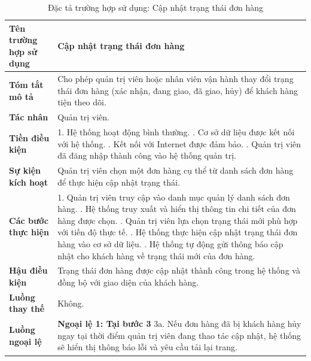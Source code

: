 {
\begin{longtable}{|>{\bfseries}p{4cm}|p{11.5cm}|}
\caption{Đặc tả trường hợp sử dụng: Cập nhật trạng thái đơn hàng}
\label{tab:uc-admin-update-order-status} \\
\hline
\textbf{Tên trường hợp sử dụng} & Cập nhật trạng thái đơn hàng \\
\hline
\textbf{Tóm tắt mô tả} & Cho phép quản trị viên hoặc nhân viên vận hành thay đổi trạng thái đơn hàng (xác nhận, đang giao, đã giao, hủy) để khách hàng tiện theo dõi. \\
\hline
\textbf{Tác nhân} & Quản trị viên. \\
\hline
\textbf{Tiền điều kiện} & 1. Hệ thống hoạt động bình thường. \newline
2. Cơ sở dữ liệu được kết nối với hệ thống. \newline
3. Kết nối với Internet được đảm bảo. \newline
4. Quản trị viên đã đăng nhập thành công vào hệ thống quản trị. \\
\hline
\textbf{Sự kiện kích hoạt} & Quản trị viên chọn một đơn hàng cụ thể từ danh sách đơn hàng để thực hiện cập nhật trạng thái. \\
\hline
\textbf{Các bước thực hiện} & 1. Quản trị viên truy cập vào danh mục quản lý danh sách đơn hàng. \newline
2. Hệ thống truy xuất và hiển thị thông tin chi tiết của đơn hàng được chọn. \newline
3. Quản trị viên lựa chọn trạng thái mới phù hợp với tiến độ thực tế. \newline
4. Hệ thống thực hiện cập nhật trạng thái đơn hàng vào cơ sở dữ liệu. \newline
5. Hệ thống tự động gửi thông báo cập nhật cho khách hàng về trạng thái mới của đơn hàng. \\
\hline
\textbf{Hậu điều kiện} & Trạng thái đơn hàng được cập nhật thành công trong hệ thống và đồng bộ với giao diện của khách hàng. \\
\hline
\textbf{Luồng thay thế} & Không. \\
\hline
\textbf{Luồng ngoại lệ} & \textbf{Ngoại lệ 1: Tại bước 3} \newline
3a. Nếu đơn hàng đã bị khách hàng hủy ngay tại thời điểm quản trị viên đang thao tác cập nhật, hệ thống sẽ hiển thị thông báo lỗi và yêu cầu tải lại trang. \\
\hline
\end{longtable}

}

